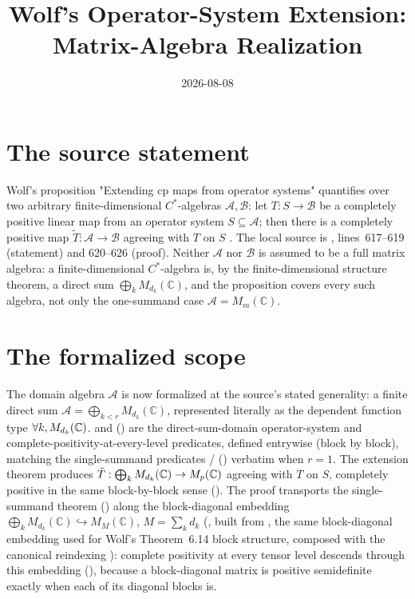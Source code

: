 \documentclass{article}
\title{Wolf's Operator-System Extension: Matrix-Algebra Realization}
\author{}
\date{2026-08-08}
\begin{document}
\maketitle
{}

\section{The source statement}

Wolf's proposition "Extending cp maps from operator systems" quantifies over
two arbitrary finite-dimensional $C^\ast$-algebras $\mathcal A,\mathcal B$: let
$T:S\to\mathcal B$ be a completely positive linear map from an operator system
$S\subseteq\mathcal A$; then there is a completely positive map
$\tilde T:\mathcal A\to\mathcal B$ agreeing with $T$ on $S$
\cite[Proposition, lines~614--626]{Wolf2012Quantum}. The local source is
, lines~617--619
(statement) and 620--626 (proof). Neither $\mathcal A$ nor $\mathcal B$ is
assumed to be a full matrix algebra: a finite-dimensional $C^\ast$-algebra is,
by the finite-dimensional structure theorem, a direct sum
$\bigoplus_k M_{d_k}(\mathbb C)$, and the proposition covers every such
algebra, not only the one-summand case $\mathcal A=M_m(\mathbb C)$.

\section{The formalized scope}

The domain algebra $\mathcal A$ is now formalized at the source's stated
generality: a finite direct sum $\mathcal A=\bigoplus_{k<r} M_{d_k}(\mathbb C)$,
represented literally as the dependent function type
$\forall k, M_{d_k}(\mathbb{C})$.  and
() are the
direct-sum-domain operator-system and complete-positivity-at-every-level
predicates, defined entrywise (block by block), matching the single-summand
predicates /
() verbatim when $r=1$. The extension
theorem 
produces $\tilde T:\bigoplus_k M_{d_k}(\mathbb{C})\to M_{p}(\mathbb{C})$ agreeing with $T$ on $S$,
completely positive in the same block-by-block sense
(). The proof transports the single-summand
theorem 
() along the block-diagonal
embedding $\bigoplus_k M_{d_k}(\mathbb C)\hookrightarrow M_M(\mathbb C)$,
$M=\sum_k d_k$ (, built from
, the same block-diagonal embedding
used for Wolf's Theorem~6.14 block structure, composed with the canonical
reindexing ): complete positivity at every tensor
level descends through this embedding
(), because a
block-diagonal matrix is positive semidefinite exactly when each of its
diagonal blocks is.
\end{document}
